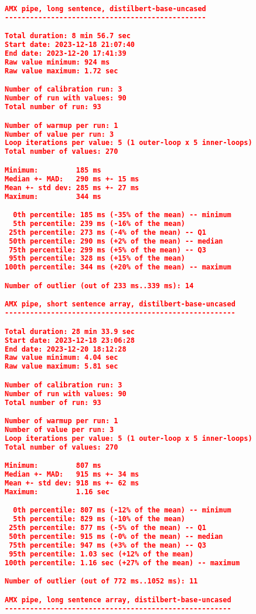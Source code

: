 \begin{lstlisting}[language=json]
AMX pipe, long sentence, distilbert-base-uncased
------------------------------------------------

Total duration: 8 min 56.7 sec
Start date: 2023-12-18 21:07:40
End date: 2023-12-20 17:41:39
Raw value minimum: 924 ms
Raw value maximum: 1.72 sec

Number of calibration run: 3
Number of run with values: 90
Total number of run: 93

Number of warmup per run: 1
Number of value per run: 3
Loop iterations per value: 5 (1 outer-loop x 5 inner-loops)
Total number of values: 270

Minimum:         185 ms
Median +- MAD:   290 ms +- 15 ms
Mean +- std dev: 285 ms +- 27 ms
Maximum:         344 ms

  0th percentile: 185 ms (-35% of the mean) -- minimum
  5th percentile: 239 ms (-16% of the mean)
 25th percentile: 273 ms (-4% of the mean) -- Q1
 50th percentile: 290 ms (+2% of the mean) -- median
 75th percentile: 299 ms (+5% of the mean) -- Q3
 95th percentile: 328 ms (+15% of the mean)
100th percentile: 344 ms (+20% of the mean) -- maximum

Number of outlier (out of 233 ms..339 ms): 14

AMX pipe, short sentence array, distilbert-base-uncased
-------------------------------------------------------

Total duration: 28 min 33.9 sec
Start date: 2023-12-18 23:06:28
End date: 2023-12-20 18:12:28
Raw value minimum: 4.04 sec
Raw value maximum: 5.81 sec

Number of calibration run: 3
Number of run with values: 90
Total number of run: 93

Number of warmup per run: 1
Number of value per run: 3
Loop iterations per value: 5 (1 outer-loop x 5 inner-loops)
Total number of values: 270

Minimum:         807 ms
Median +- MAD:   915 ms +- 34 ms
Mean +- std dev: 918 ms +- 62 ms
Maximum:         1.16 sec

  0th percentile: 807 ms (-12% of the mean) -- minimum
  5th percentile: 829 ms (-10% of the mean)
 25th percentile: 877 ms (-5% of the mean) -- Q1
 50th percentile: 915 ms (-0% of the mean) -- median
 75th percentile: 947 ms (+3% of the mean) -- Q3
 95th percentile: 1.03 sec (+12% of the mean)
100th percentile: 1.16 sec (+27% of the mean) -- maximum

Number of outlier (out of 772 ms..1052 ms): 11

AMX pipe, long sentence array, distilbert-base-uncased
------------------------------------------------------


\end{lstlisting}
